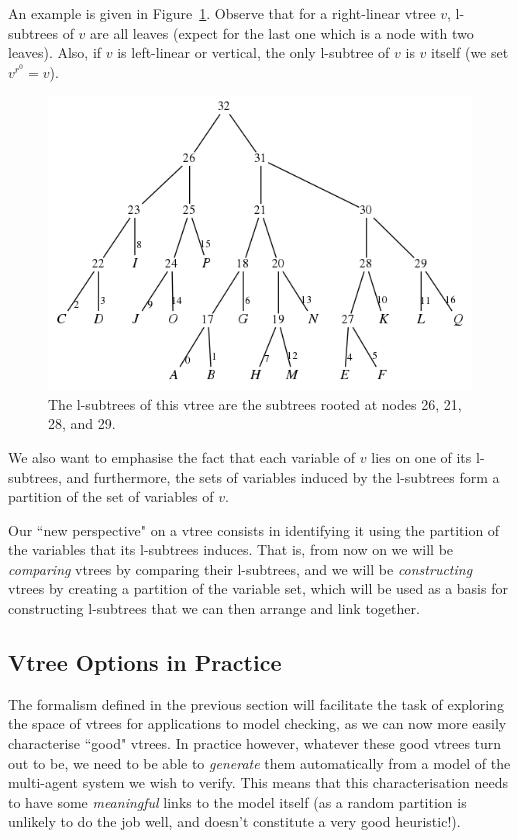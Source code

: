 \documentclass[11pt]{report}
\begin{document}
An example is given in Figure~\ref{fig:lsubtrees_vtree_example}. Observe that for a right-linear vtree $v$, l-subtrees of $v$ are all leaves (expect for the last one which is a node with two leaves). Also, if $v$ is left-linear or vertical, the only l-subtree of $v$ is $v$ itself (we set $v^{r^0} = v$). 

\begin{figure}
\centering
\includegraphics[scale=0.5]{pseudorightlinearfirstexample.png}
\caption{The l-subtrees of this vtree are the subtrees rooted at nodes 26, 21, 28, and 29.}
\label{fig:lsubtrees_vtree_example}
\end{figure}

We also want to emphasise the fact that each variable of $v$ lies on one of its l-subtrees, and furthermore, the sets of variables induced by the l-subtrees form a partition of the set of variables of $v$.

Our ``new perspective" on a vtree consists in identifying it using the partition of the variables that its l-subtrees induces. That is, from now on we will be \textit{comparing }vtrees by comparing their l-subtrees, and we will be \textit{constructing }vtrees by creating a partition of the variable set, which will be used as a basis for constructing l-subtrees that we can then arrange and link together.

\subsection{Vtree Options in Practice}
\label{vtree_options_in_practice}
The formalism defined in the previous section will facilitate the task of exploring the space of vtrees for applications to model checking, as we can now more easily characterise ``good" vtrees. In practice however, whatever these good vtrees turn out to be, we need to be able to \textit{generate} them automatically from a model of the multi-agent system we wish to verify. This means that this characterisation needs to have some \textit{meaningful} links to the model itself (as a random partition is unlikely to do the job well, and doesn't constitute a very good heuristic!).
\end{document}
